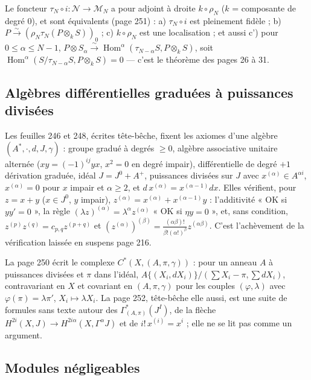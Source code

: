\documentclass[11pt,a4paper]{article}
\begin{document}
Le foncteur $\tau_N \circ i : \mathcal{N} \to \mathcal{M}_N$ a pour adjoint à
droite $k \circ \rho_N$ ($k$ = composante de degré $0$), et sont équivalents
(page 251) : a) $\tau_N \circ i$ est pleinement fidèle ; b) $P
\xrightarrow{\sim} (\rho_N\tau_N(P \otimes_k S))_0$ ; c) $k \circ \rho_N$ est
une localisation ; et aussi c') pour $0 \leq \alpha \leq N-1$, $P \otimes
S_\alpha \xrightarrow{\sim} \operatorname{Hom}^\alpha(\tau_{N-\alpha}S, P
\otimes_k S)$, soit $\operatorname{Hom}^\alpha(S/\tau_{N-\alpha}S, P \otimes_k S)
= 0$ — c'est le théorème des pages 26 à 31.

\subsection*{Algèbres différentielles graduées à puissances divisées}

Les feuilles 246 et 248, écrites tête-bêche, fixent les axiomes d'une algèbre
$(A^*, \cdot, d, J, \gamma)$ : groupe gradué à degrés $\geq 0$, algèbre
associative unitaire alternée ($xy = (-1)^{ij}yx$, $x^2 = 0$ en degré impair),
différentielle de degré $+1$ dérivation graduée, idéal $J = J^0 + A^+$,
puissances divisées sur $J$ avec $x^{(\alpha)} \in A^{\alpha i}$, $x^{(\alpha)} =
0$ pour $x$ impair et $\alpha \geq 2$, et $d\,x^{(\alpha)} = x^{(\alpha-1)}dx$.
Elles vérifient, pour $z = x + y$ ($x \in J^0$, $y$ impair), $z^{(\alpha)} =
x^{(\alpha)} + x^{(\alpha-1)}y$ : l'additivité « OK si $yy' = 0$ », la règle
$(\lambda z)^{(\alpha)} = \lambda^\alpha z^{(\alpha)}$ « OK si $\eta y = 0$ »,
et, sans condition, $z^{(p)}z^{(q)} = c_{p,q}z^{(p+q)}$ et $(z^{(\alpha)})^{(\beta)}
= \frac{(\alpha\beta)!}{\beta!(\alpha!)^\beta}z^{(\alpha\beta)}$. C'est
l'achèvement de la vérification laissée en suspens page 216.

La page 250 écrit le complexe $C^*(X, (A, \pi, \gamma))$ : pour un anneau $A$ à
puissances divisées et $\pi$ dans l'idéal, $A\{(X_i, dX_i)\}/(\sum X_i - \pi,
\sum dX_i)$, contravariant en $X$ et covariant en $(A,\pi,\gamma)$ pour les
couples $(\varphi, \lambda)$ avec $\varphi(\pi) = \lambda\pi'$, $X_i \mapsto
\lambda X_i$. La page 252, tête-bêche elle aussi, est une suite de formules
sans texte autour des $\Gamma^*_{(A,\pi)}(J^I)$, de la flèche $H^{2i}(X, J) \to
H^{2i\alpha}(X, \Gamma^\alpha J)$ et de $i!\,x^{(i)} = x^i$ ; elle ne se lit pas
comme un argument.

\subsection*{Modules négligeables}
\end{document}
